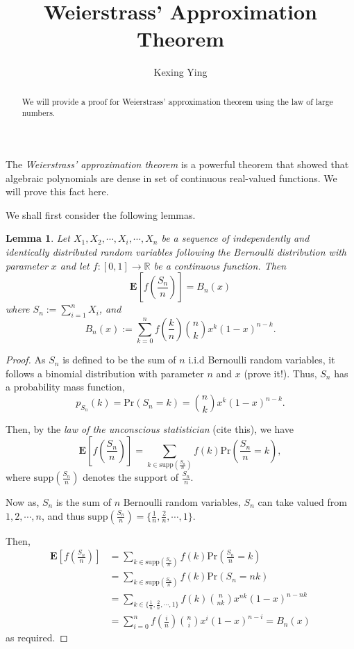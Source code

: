 \documentclass[
]{article}
\title{Weierstrass' Approximation Theorem}
\author{Kexing Ying}
\date{}
\newtheorem{lemma}{Lemma}[theorem]
\begin{document}
\maketitle
\begin{abstract}
We will provide a proof for Weierstrass' approximation theorem using the
law of large numbers.
\end{abstract}

The \emph{Weierstrass' approximation theorem} is a powerful theorem that
showed that algebraic polynomials are dense in set of continuous
real-valued functions. We will prove this fact here.

We shall first consider the following lemmas.

\begin{lemma}\label{l}
Let $X_1, X_2, \cdots , X_i, \cdots , X_n$ be a sequence of independently and identically distributed random 
variables following the Bernoulli distribution with parameter $x$ and let $f : [0, 1] \to \mathbb{R}$ be a 
continuous function. Then
$$ \mathbf{E}\left[f \left(\frac{S_n}{n} \right)\right] = B_n(x) $$
where $S_n := \sum_{i = 1}^n X_i$, and 
$$B_n(x) := \sum_{k = 0}^n f \left(\frac{k}{n}\right) \binom{n}{k} x^k (1 - x)^{n - k}.$$
\end{lemma}
\begin{proof}
As $S_n$ is defined to be the sum of $n$ i.i.d Bernoulli random variables, it follows a binomial distribution 
with parameter $n$ and $x$ (prove it!). Thus, $S_n$ has a probability mass function,
$$p_{S_n}(k) = \text{Pr}(S_n = k) = \binom{n}{k} x^k(1 - x)^{n-k}. $$

Then, by the \textit{law of the unconscious statistician} (cite this), we have 
$$\mathbf{E}\left[f \left(\frac{S_n}{n} \right)\right] = \sum_{k \in \text{supp}\left(\frac{S_n}{n}\right)} f(k) \text{Pr}\left(\frac{S_n}{n} = k\right),$$
where $\text{supp}\left(\frac{S_n}{n}\right)$ denotes the support of $\frac{S_n}{n}$.

Now as, $S_n$ is the sum of $n$ Bernoulli random variables, $S_n$ can take valued from $1, 2, \cdots, n$, and 
thus $\text{supp}\left(\frac{S_n}{n}\right) = \{\frac{1}{n}, \frac{2}{n}, \cdots, 1 \}$.

Then, 
\begin{align*}
\mathbf{E}\left[f \left(\frac{S_n}{n} \right)\right] & = \sum_{k \in \text{supp}\left(\frac{S_n}{n}\right)} f(k) \text{Pr}\left(\frac{S_n}{n} = k\right) \\
& = \sum_{k \in \text{supp}\left(\frac{S_n}{n}\right)} f(k) \text{Pr}\left(S_n = nk\right) \\
& = \sum_{k \in \{\frac{1}{n}, \frac{2}{n}, \cdots, 1 \}} f(k) \binom{n}{nk} x^{nk} (1 - x)^{n-nk}\\
& = \sum_{i = 0}^n f\left(\frac{i}{n}\right) \binom{n}{i} x^i (1 - x)^{n - i} = B_n(x)
\end{align*}
as required.

\end{proof}
\end{document}
